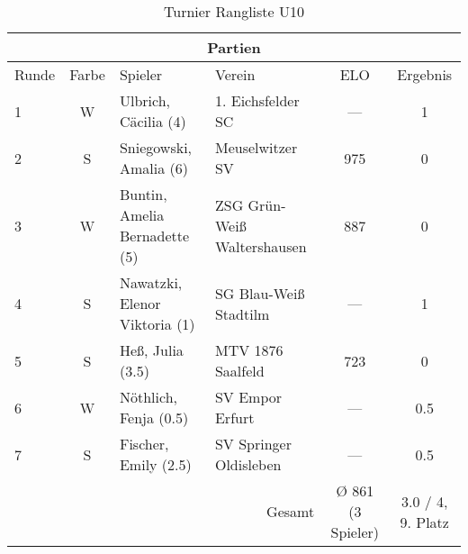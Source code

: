 \begin{table}[htbp]
\centering
\caption{Turnier Rangliste U10}
\begin{tabular}{|l|c|l|l|c|c|}
\hline
\multicolumn{6}{|c|}{Partien} \\
\hline
Runde & Farbe & Spieler & Verein & ELO & Ergebnis \\
\hline
1 & W & Ulbrich, Cäcilia (4) & 1. Eichsfelder SC & --- & 1 \\
2 & S & Sniegowski, Amalia (6) & Meuselwitzer SV & 975 & 0 \\
3 & W & Buntin, Amelia Bernadette (5) & ZSG Grün-Weiß Waltershausen & 887 & 0 \\
4 & S & Nawatzki, Elenor Viktoria (1) & SG Blau-Weiß Stadtilm & --- & 1 \\
5 & S & Heß, Julia (3.5) & MTV 1876 Saalfeld & 723 & 0 \\
6 & W & Nöthlich, Fenja (0.5) & SV Empor Erfurt & --- & 0.5 \\
7 & S & Fischer, Emily (2.5) & SV Springer Oldisleben & --- & 0.5 \\
\hline
\multicolumn{4}{|r|}{Gesamt} & Ø 861 (3 Spieler) & 3.0 / 4, 9. Platz \\
\hline
\end{tabular}
\end{table}